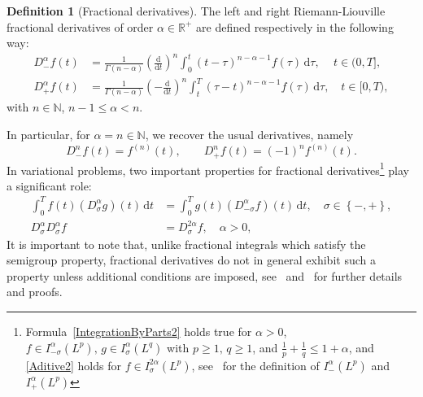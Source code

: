 \documentclass[a4paper,10pt,reqno]{amsart}
\theoremstyle{definition}
\newtheorem{definition}{Definition}[section]
\newcommand{\R}{\mathbb{R}}      %
\newcommand{\N}{\mathbb{N}}      %
\newcommand{\dd}{\mathrm{d}}
\begin{document}
\begin{definition}[Fractional derivatives]
The left and right Riemann-Liouville fractional derivatives of order $\alpha\in \R^+$  are defined respectively in the following way: 
\begin{subequations}\label{RLDer}
\begin{align}
D^{\alpha}_{-}f(t)&=\frac{1}{\Gamma(n-\alpha)}\left(\frac{\dd}{\dd t}\right)^n\int_0^t(t-\tau)^{n-\alpha-1}f(\tau)\,\dd\tau,\quad\,t\in (0,T],\label{RLDer:a}\\
D^{\alpha}_{+}f(t)&=\frac{1}{\Gamma(n-\alpha)}\left(-\frac{\dd}{\dd t}\right)^n\int_t^T(\tau-t)^{n-\alpha-1}f(\tau)\,\dd\tau,\quad t\in [0,T), \label{RLDer:b}
\end{align}
\end{subequations}
with $n \in \N$, $n -1\leq \alpha < n$.
\end{definition}
In particular, for $\alpha=n\in\N$, we recover the usual derivatives, namely
\[D^{n}_{-}f(t)=f^{(n)}(t),\qquad D^{n}_{+}f(t)=(-1)^nf^{(n)}(t).\]
In variational problems, two important properties for fractional derivatives\footnote{Formula~\eqref{IntegrationByParts2} holds true  for $\alpha>0$, $f \in  I_{-\sigma}^\alpha(L^p),\, g\in I_{\sigma}^\alpha(L^q)$ with $p \geq 1,\, q \geq 1$, and
$\frac{1}{p} + \frac{1}{q} \leq 1 + \alpha$, and \eqref{Aditive2} holds for $f\in I_\sigma^{2\alpha}(L^p)$, see~\cite{TheBook} for the definition of $I_-^\alpha(L^p)$ and $I_+^\alpha(L^p)$} play a significant role:
\begin{subequations}\label{FracDerProperties}
\begin{align}
\int_0^Tf(t)\left(D^{\alpha}_{\sigma}g\right)(t)\, \dd t&=\int_0^T g(t) \left(D^{\alpha}_{-\sigma}f\right)(t)\, \dd t,\quad  \sigma\in\left\{-,+\right\}, \label{IntegrationByParts2}\\
D_{\sigma}^{\alpha}D_{\sigma}^{\alpha}f&=D_{\sigma}^{2\alpha}f,\quad \alpha>0,\label{Aditive2}
\end{align}
\end{subequations}
It is important to note that, unlike fractional integrals which satisfy the semigroup property, fractional derivatives do not in general exhibit such a property unless additional conditions are imposed, see~\cite[Theorem 2.13]{Kai} and~\cite{TheBook} for further details and proofs.
\end{document}
